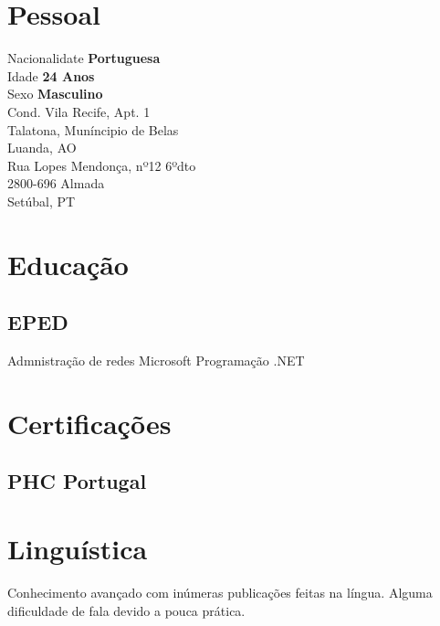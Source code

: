 \documentclass[letterpaper]{deedy-resume} %
\begin{document}
\begin{minipage}[t]{0.33\textwidth}

\section{Pessoal} 

Nacionalidate \textbf{Portuguesa}\\
Idade \textbf{24 Anos}\\
Sexo \textbf{Masculino}\\

Cond. Vila Recife, Apt. 1\\
Talatona, Muníncipio de Belas\\
Luanda, AO\\
\sectionspace{}
Rua Lopes Mendonça, nº12 6ºdto\\
2800-696 Almada\\
Setúbal, PT\\

\sectionspace

\section{Educação}
\subsection{EPED}
Admnistração de redes Microsoft
Programação .NET

\sectionspace

\section{Certificações}
\subsection{PHC Portugal}

\sectionspace

\section{Linguística}
Conhecimento avançado com inúmeras publicações feitas na língua. Alguma dificuldade de fala devido a pouca prática.


\end{minipage}
\end{document}
